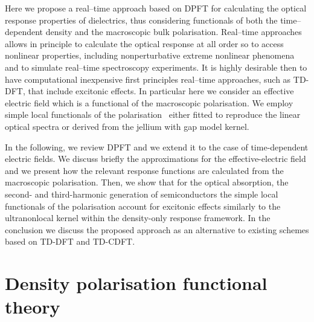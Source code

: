 Here we propose a real--time approach based on DPFT for calculating the optical response properties of dielectrics, thus considering functionals of both the time--dependent density and the macroscopic bulk polarisation.
Real--time approaches allows in principle to calculate the optical response at all order so to access nonlinear properties\cite{takimoto:154114}, including nonperturbative extreme nonlinear phenomena\cite{lee2014first} and to simulate real--time spectroscopy experiments.\cite{otobe2015femtosecond} It is highly desirable then to have computational inexpensive first principles real--time approaches, such as TD-DFT, that include excitonic effects.            
In particular here we consider an effective electric field which is a functional of the macroscopic polarisation. We employ simple local functionals of the polarisation~\cite{maitra2003current,PhysRevLett.115.137402} either fitted to reproduce the linear optical spectra\cite{LRC} or derived from the jellium with gap model kernel.~\cite{jgm}

In the following, we review DPFT and we extend it to the case of time-dependent electric fields. We discuss briefly the approximations for the effective-electric field and we present how the relevant response functions are calculated from the macroscopic polarisation.  Then, we show that for the optical absorption, the second- and third-harmonic generation of semiconductors  the simple local functionals of the polarisation account for excitonic effects similarly to the ultranonlocal kernel within the density-only response framework. In the conclusion we discuss the proposed approach as an alternative to existing schemes based on TD-DFT and TD-CDFT. 



\section{Density polarisation functional theory}

